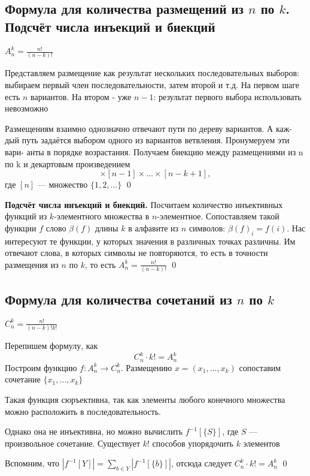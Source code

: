 \documentclass[a4paper]{article}
\begin{document}
\subsection{Формула для количества размещений из $n$ по $k$. Подсчёт числа инъекций и биекций}
\theorem $A^k_n=\displaystyle\frac{n!}{(n-k)!}$

\proof Представляем размещение как результат нескольких последовательных выборов: выбираем первый член последовательности, затем второй и т.д. На первом шаге есть $n$ вариантов. На втором - уже $n-1$: результат первого выбора использовать невозможно

Размещениям взаимно однозначно отвечают пути по дереву вариантов. А каж- дый путь задаётся выбором одного из вариантов ветвления. Пронумеруем эти вари- анты в порядке возрастания. Получаем биекцию между размещениями из n по k и декартовым произведением
\begin{equation*}
    [n]\times[n-1]\times\ldots\times[n-k+1],
\end{equation*}
где $[n]$ — множество $\{1,2,\ldots\}$ \qed

\textbf{Подсчёт числа инъекций и биекций.} Посчитаем количество инъективных функций из $k$-элементного множества в $n$-элементное. Сопоставляем такой функции $f$ слово $\beta(f)$ длины $k$ в алфавите из $n$ символов: $\beta(f)_i=f(i)$. Нас интересуют те функции, у которых значения в различных точках различны. Им отвечают слова, в которых символы не повторяются, то есть в точности размещения из $n$ по $k$, то есть $A^k_n=\frac{n!}{(n-k)!}$ \qed

\subsection{Формула для количества сочетаний из $n$ по $k$}
\theorem $C_n^k=\frac{n!}{(n-k)!k!}$

\proof Перепишем формулу, как
\begin{equation*}
    C_n^k\cdot k!=A_n^k
\end{equation*}
Построим функцию $f: A_n^k\rightarrow C_n^k$. Размещению $x=(x_1,\ldots,x_k)$ сопоставим сочетание $\{x_1,\ldots,x_k\}$

Такая функция сюръективна, так как элементы любого конечного множества можно расположить в последовательность. 

Однако она не инъективна, но можно вычислить $f^{-1}[\{S\}]$, где $S$ — произвольное сочетание. Существует $k!$ способов упорядочить $k$ элементов

Вспомним, что $|f^{-1}[Y]|=\sum\limits_{b\in Y} |f^{-1}[\{b\}]|$, отсюда следует $C_n^k\cdot k!=A_n^k$ \qed
\end{document}
